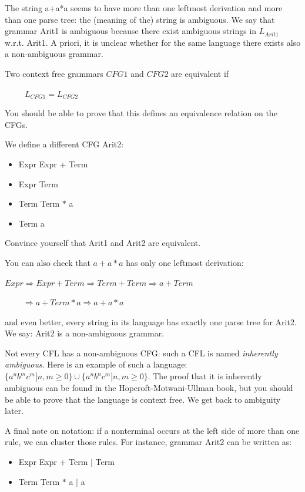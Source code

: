 The string a+a*a seems to have more than one leftmost derivation and
more than one parse tree: the (meaning of the) string is ambiguous.
We say that grammar Arit1 is ambiguous because there exist ambiguous
strings in $L_{Arit1}$ w.r.t. Arit1. A priori, it is unclear whether
for the same language there exists also a non-ambiguous grammar.

\begin{definition}
Two context free grammars $CFG1$ and $CFG2$ are equivalent if

$~~~~~~~~~~~L_{CFG1} = L_{CFG2}$
\end{definition}

You should be able to prove that this defines an equivalence relation
on the CFGs.

We define a different CFG Arit2\label{arit2label}:

\begin{itemize}
\item Expr \rpijl Expr + Term
\item Expr \rpijl Term
\item Term \rpijl Term $*$ a
\item Term \rpijl a
\end{itemize}

Convince yourself that Arit1 and Arit2 are equivalent.

You can also check that $a+a*a$ has only one leftmost derivation:


$Expr \Rightarrow Expr + Term \Rightarrow Term + Term \Rightarrow a + Term$

$~~~~~~~~~~\Rightarrow a + Term * a \Rightarrow a + a * a$


and even better, every string in its language has exactly one parse
tree for Arit2. We say: Arit2 is a non-ambiguous grammar.


Not every CFL has a non-ambiguous CFG: such a CFL is named {\em
  inherently ambiguous}. Here is an example of such a language:
%
 $\{a^nb^mc^m| n,m \geq 0\} \cup \{a^nb^nc^m| n,m \geq 0\}$. The proof that it is
inherently ambiguous can be found in the Hopcroft-Motwani-Ullman book,
but you should be able to prove that the language is context free.
We get back to ambiguity later.

A final note on notation: if a nonterminal occurs at the left side of
more than one rule, we can cluster those rules. For instance, grammar
Arit2 can be written as:
\begin{itemize}
\item Expr \rpijl Expr + Term $|$ Term
\item Term \rpijl Term $*$ a $|$ a
\end{itemize}




